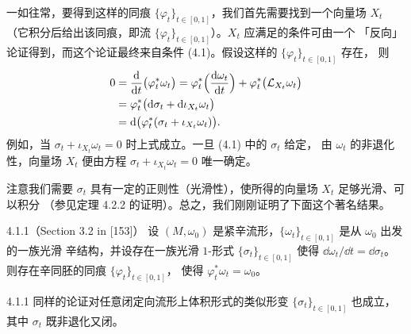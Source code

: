 一如往常，要得到这样的同痕 $\{\varphi_t\}_{t\in[0,1]}$，我们首先需要找到一个向量场 $X_t$
（它积分后给出该同痕，即流 $\{\varphi_t\}_{t\in[0,1]}$）。$X_t$ 应满足的条件可由一个
「反向」论证得到，而这个论证最终来自条件 (4.1)。假设这样的 $\{\varphi_t\}_{t\in[0,1]}$ 存在，
则
\begin{equation*}
  \begin{aligned}
    0&=\frac{\mathrm{d}}{\mathrm{d} t}\bigl(\varphi_t^*\omega_t\bigr)
    =\varphi_t^*\Bigl(\frac{\mathrm{d}\omega_t}{\mathrm{d} t}\Bigr)
    +\varphi_t^*\bigl(\mathcal L_{X_t}\omega_t\bigr)\\
    &=\varphi_t^*\bigl(\mathrm{d}\sigma_t+\mathrm{d}\iota_{X_t}\omega_t\bigr)\\
    &=\mathrm{d}\bigl(\varphi_t^*(\sigma_t+\iota_{X_t}\omega_t)\bigr).
  \end{aligned}
\end{equation*}
例如，当 $\sigma_t+\iota_{X_t}\omega_t=0$ 时上式成立。一旦 (4.1) 中的 $\sigma_t$ 给定，
由 $\omega_t$ 的非退化性，向量场 $X_t$ 便由方程 $\sigma_t+\iota_{X_t}\omega_t=0$ 唯一确定。

注意我们需要 $\sigma_t$ 具有一定的正则性（光滑性），使所得的向量场 $X_t$ 足够光滑、可以积分
（参见定理 4.2.2 的证明）。总之，我们刚刚证明了下面这个著名结果。

\begin{wthm}{4.1.1}（Section 3.2 in [153]）
  设 $(M,\omega_0)$ 是紧辛流形，$\{\omega_t\}_{t\in[0,1]}$ 是从 $\omega_0$ 出发的一族光滑
  辛结构，并设存在一族光滑 $1$-形式 $\{\sigma_t\}_{t\in[0,1]}$ 使得
  $\dd\omega_t/\dd t=\dd\sigma_t$。则存在辛同胚的同痕 $\{\varphi_t\}_{t\in[0,1]}$，
  使得 $\varphi_t^*\omega_t=\omega_0$。
\end{wthm}

\begin{wrem}{4.1.1}
  同样的论证对任意闭定向流形上体积形式的类似形变 $\{\sigma_t\}_{t\in[0,1]}$ 也成立，
  其中 $\sigma_t$ 既非退化又闭。
\end{wrem}

